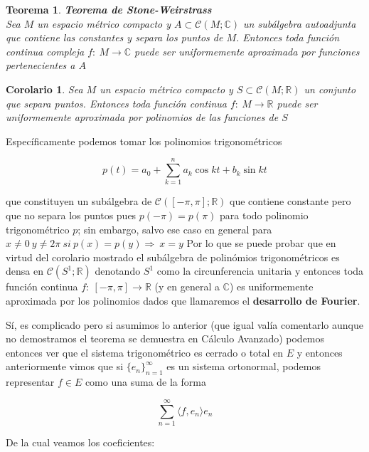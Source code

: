 \documentclass[a4paper,spanish]{article}
\def\C {\mathbb{C}}
\def\R {\mathbb{R}}
\newtheorem{teo}[prop]{Teorema}
\newtheorem{cor}[prop]{Corolario}
\numberwithin{equation}{section}
\begin{document}
\begin{teo}\textbf{Teorema de Stone-Weirstrass}
\\Sea $M$ un espacio m\'etrico compacto y $A\subset \mathcal{C}\left({M;\C}\right)$ un sub\'algebra autoadjunta que contiene las constantes y separa los puntos de $M$. Entonces toda funci\'on continua compleja $f: \ M \rightarrow \C$ puede ser uniformemente aproximada por funciones pertenecientes a $A$ 
\end{teo}

\begin{cor}
Sea $M$ un espacio m\'etrico compacto y $S\subset \mathcal{C}\left({M;\R}\right)$ un conjunto que separa puntos. Entonces toda funci\'on continua $f: \ M \rightarrow \R$ puede ser uniformemente aproximada por polinomios de las funciones de $S$
\end{cor}

Espec\'ificamente podemos tomar los polinomios trigonom\'etricos

\[p\left(t\right)= a_0 + \sum \limits_{k=1}^{n}a_k\cos{kt} + b_k \sin{kt} \]

que constituyen un sub\'algebra de $\mathcal{C}\left({[-\pi,\pi];\R}\right)$ que contiene constante pero que no separa los puntos pues $p(-\pi)=p(\pi)$ para todo polinomio trigonom\'etrico $p$; sin embargo, salvo ese caso en general para $x\neq0 \ y\neq 2\pi \ si \ p(x)=p(y) \Longrightarrow \ x=y$ Por lo que se puede probar que en virtud del corolario mostrado el sub\'algebra de polin\'omios trigonom\'etricos es densa en $\mathcal{C}\left({S^1;\R}\right)$ denotando $S^1$ como la circunferencia unitaria y entonces toda funci\'on continua $f: \ [-\pi,\pi] \rightarrow \R$ (y en general a $\C$) es uniformemente aproximada por los polinomios dados que llamaremos el \textbf{desarrollo de Fourier}.

S\'i, es complicado pero si asumimos lo anterior (que igual val\'ia comentarlo aunque no demostramos el teorema se demuestra en C\'alculo Avanzado) podemos entonces ver que el sistema trigonom\'etrico es cerrado o total en $E$ y entonces anteriormente vimos que si $\lbrace{e_n}\rbrace_{n=1}^{\infty}$ es un sistema ortonormal, podemos representar $f \in E$ como una suma de la forma

\[\sum \limits _{n=1}^{\infty}{\langle{f,e_n}\rangle e_n}\] 

De la cual veamos los coeficientes:
\end{document}
